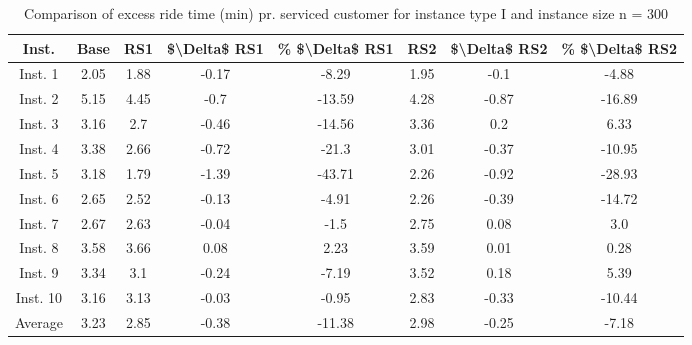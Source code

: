 \begin{table}[H]
\centering
\begin{tabular}{cccccccc}
  \hline
  \textbf{Inst.} & \textbf{Base} & \textbf{RS1} & \textbf{\$\textbackslash{}Delta\$  RS1} & \textbf{\% \$\textbackslash{}Delta\$  RS1} & \textbf{RS2} & \textbf{\$\textbackslash{}Delta\$  RS2} & \textbf{\% \$\textbackslash{}Delta\$  RS2} \\\hline
  Inst. 1 & 2.05 & 1.88 & -0.17 & -8.29 & 1.95 & -0.1 & -4.88 \\
  Inst. 2 & 5.15 & 4.45 & -0.7 & -13.59 & 4.28 & -0.87 & -16.89 \\
  Inst. 3 & 3.16 & 2.7 & -0.46 & -14.56 & 3.36 & 0.2 & 6.33 \\
  Inst. 4 & 3.38 & 2.66 & -0.72 & -21.3 & 3.01 & -0.37 & -10.95 \\
  Inst. 5 & 3.18 & 1.79 & -1.39 & -43.71 & 2.26 & -0.92 & -28.93 \\
  Inst. 6 & 2.65 & 2.52 & -0.13 & -4.91 & 2.26 & -0.39 & -14.72 \\
  Inst. 7 & 2.67 & 2.63 & -0.04 & -1.5 & 2.75 & 0.08 & 3.0 \\
  Inst. 8 & 3.58 & 3.66 & 0.08 & 2.23 & 3.59 & 0.01 & 0.28 \\
  Inst. 9 & 3.34 & 3.1 & -0.24 & -7.19 & 3.52 & 0.18 & 5.39 \\
  Inst. 10 & 3.16 & 3.13 & -0.03 & -0.95 & 2.83 & -0.33 & -10.44 \\
  Average & 3.23 & 2.85 & -0.38 & -11.38 & 2.98 & -0.25 & -7.18 \\\hline
\end{tabular}
\caption{Comparison of excess ride time (min) pr. serviced customer for instance type I and instance size n = 300}
\label{tab:wait:resrelocation-excess-ride-time-comparison_I_300}
\end{table}
